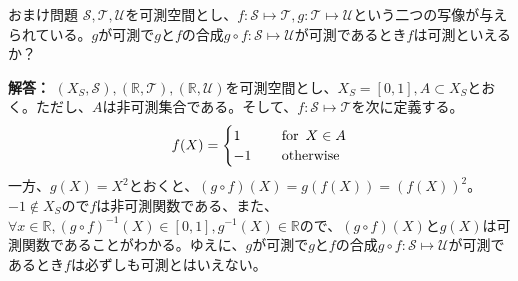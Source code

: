 \documentclass{jsarticle}
\begin{document}
\begin{itembox}[l]{おまけ問題}
$\mathcal{S},\mathcal{T},\mathcal{U}$を可測空間とし、$f:\mathcal{S} \mapsto \mathcal{T},g:\mathcal{T} \mapsto \mathcal{U}$という二つの写像が与えられている。$g$が可測で$g$と$f$の合成$g \circ f:\mathcal{S} \mapsto \mathcal{U}$が可測であるとき$f$は可測といえるか？
\end{itembox}
{\bf 解答：}
$(X_S,\mathcal{S}),(\mathbb{R},\mathcal{T}),(\mathbb{R},\mathcal{U})$を可測空間とし、$X_S = [0,1],A \subset X_S$とおく。ただし、$A$は非可測集合である。そして、$f:\mathcal{S} \mapsto \mathcal{T}$を次に定義する。
\begin{equation}
f(X)=\begin{cases}
1   &\text{\,\,\,\,\, for\,\,\,} X \in A \\
-1 &\text{\,\,\,\,\, otherwise}
\end{cases}
\end{equation}
一方、$g(X)=X^2$とおくと、$(g \circ f)(X)=g(f(X))=(f(X))^2$。$-1 \notin X_S$ので$f$は非可測関数である、また、$\forall x \in \mathbb{R}, (g \circ f)^{-1}(X) \in [0,1],g^{-1}(X) \in \mathbb{R}$ので、$ (g \circ f)(X)$と$g(X)$は可測関数であることがわかる。ゆえに、$g$が可測で$g$と$f$の合成$g \circ f:\mathcal{S} \mapsto \mathcal{U}$が可測であるとき$f$は必ずしも可測とはいえない。
\end{document}
